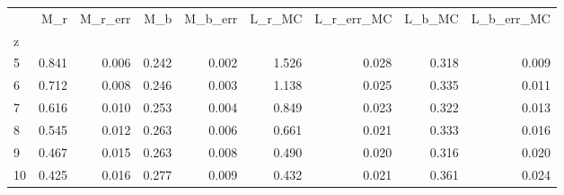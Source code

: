 \begin{tabular}{lrrrrrrrr}
\toprule
{} &    M\_r &  M\_r\_err &    M\_b &  M\_b\_err &  L\_r\_MC &  L\_r\_err\_MC &  L\_b\_MC &  L\_b\_err\_MC \\
z  &        &          &        &          &         &             &         &             \\
\midrule
5  &  0.841 &    0.006 &  0.242 &    0.002 &   1.526 &       0.028 &   0.318 &       0.009 \\
6  &  0.712 &    0.008 &  0.246 &    0.003 &   1.138 &       0.025 &   0.335 &       0.011 \\
7  &  0.616 &    0.010 &  0.253 &    0.004 &   0.849 &       0.023 &   0.322 &       0.013 \\
8  &  0.545 &    0.012 &  0.263 &    0.006 &   0.661 &       0.021 &   0.333 &       0.016 \\
9  &  0.467 &    0.015 &  0.263 &    0.008 &   0.490 &       0.020 &   0.316 &       0.020 \\
10 &  0.425 &    0.016 &  0.277 &    0.009 &   0.432 &       0.021 &   0.361 &       0.024 \\
\bottomrule
\end{tabular}
